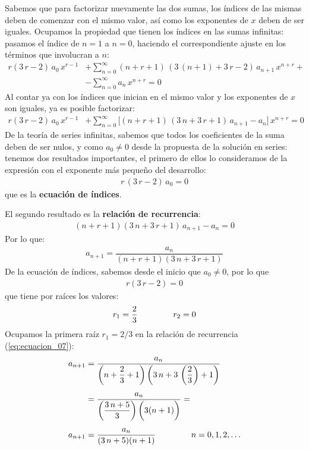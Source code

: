 Sabemos que para factorizar nuevamente las dos sumas, los índices de las mismas deben de comenzar con el mismo valor, así como los exponentes de $x$ deben de ser iguales. Ocupamos la propiedad que tienen los índices en las sumas infinitas: pasamos el índice de $n = 1$ a $n = 0$, haciendo el correspondiente ajuste en los términos que involucran a $n$:
\begin{align*}
r( 3 \, r - 2) \, a_{0} \, x^{r-1} &+ \sum_{n=0}^{\infty} (n + r + 1) \, (3 \, (n + 1) + 3 \, r - 2) \, a_{n+1} \, x^{n+r} + \\[0.5em]
&- \sum_{n=0}^{\infty} a_{n} \, x^{n+r} = 0
\end{align*}    
Al contar ya con los índices que inician en el mismo valor y los exponentes de $x$ son iguales, ya es posible factorizar:
\begin{align*}
r( 3 \, r - 2) \, a_{0} \, x^{r-1} &+ \sum_{n=0}^{\infty} \bigg[ (n + r + 1) \, (3 \, n + 3 \, r + 1) \, a_{n+1} - a_{n} \bigg] \, x^{n+r} = 0    
\end{align*}
De la teoría de series infinitas, sabemos que todos los coeficientes de la suma deben de ser nulos, y como $a_{0} \neq 0$ desde la propuesta de la solución en series: tenemos dos resultados importantes, el primero de ellos lo consideramos de la expresión con el exponente más pequeño del desarrollo:
\begin{align*}
r \, (3 \, r - 2) \, a_{0} = 0
\end{align*}
que es la \textbf{ecuación de índices}.
\par
El segundo resultado es la \textbf{relación de recurrencia}:
\begin{align*}
(n + r + 1)(3 \, n + 3 \, r + 1) \, a_{n+1} - a_{n} = 0
\end{align*}
Por lo que:
\begin{align}
a_{n+1} = \dfrac{a_{n}}{(n + r + 1)(3 \, n + 3 \, r + 1)}
\label{eq:ecuacion_07}
\end{align}
De la ecuación de índices, sabemos desde el inicio que $a_{0} \neq 0$, por lo que
\begin{align}
r (3 \, r - 2) = 0
\label{eq:ecuacion_06}
\end{align}
que tiene por raíces los valores:
\begin{align*}
r_{1} = \dfrac{2}{3} \hspace{1.5cm} r_{2} = 0
\end{align*}
Ocupamos la primera raíz $r_{1} = 2/3$ en la relación de recurrencia (\ref{eq:ecuacion_07}):
\begin{align}
\begin{aligned}[b]
a_{n+1} &= \dfrac{a_{n}}{ \left( n + \dfrac{2}{3} + 1\right) \left(3 \, n + 3 \, \left( \dfrac{2}{3} \right) + 1\right)} \\[0.5em]
&= \dfrac{a_{n}}{\left( \dfrac{3 \, n + 5}{3} \right) \bigg( 3 (n + 1) \bigg)} = \\[0.5em]
a_{n+1} &= \dfrac{a_{n}}{(3 \, n + 5)(n + 1)} \hspace{1.5cm} n = 0, 1, 2, \ldots
\end{aligned}
\label{eq:ecuacion_08}    
\end{align}
